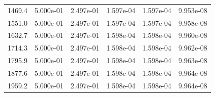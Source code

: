 \documentclass{report}
\begin{document}
\begin{table}[htbp]
\begin{tabular}{lccccc}
1469.4 & 5.000e-01 & 2.497e-01 & 1.597e-04 & 1.597e-04 & 9.953e-08 \\
1551.0 & 5.000e-01 & 2.497e-01 & 1.597e-04 & 1.597e-04 & 9.958e-08 \\
1632.7 & 5.000e-01 & 2.497e-01 & 1.598e-04 & 1.598e-04 & 9.960e-08 \\
1714.3 & 5.000e-01 & 2.497e-01 & 1.598e-04 & 1.598e-04 & 9.962e-08 \\
1795.9 & 5.000e-01 & 2.497e-01 & 1.598e-04 & 1.598e-04 & 9.963e-08 \\
1877.6 & 5.000e-01 & 2.497e-01 & 1.598e-04 & 1.598e-04 & 9.964e-08 \\
1959.2 & 5.000e-01 & 2.497e-01 & 1.598e-04 & 1.598e-04 & 9.964e-08 \\
\bottomrule
\end{tabular}
\end{table}

\newpage
\end{document}
